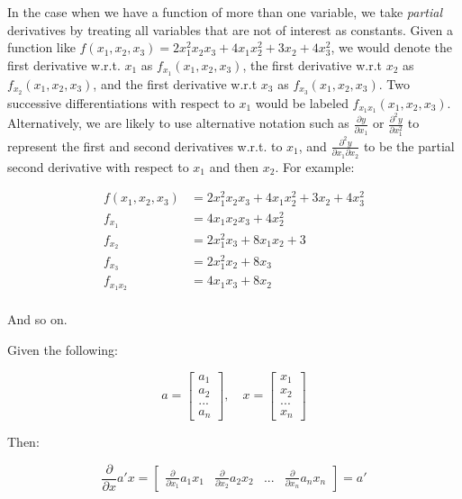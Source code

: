 \documentclass[]{book}
\theoremstyle{definition}
\theoremstyle{definition}
\theoremstyle{definition}
\theoremstyle{remark}
\begin{document}
In the case when we have a function of more than one variable, we take
\emph{partial} derivatives by treating all variables that are not of
interest as constants. Given a function like
\(f(x_1,x_2,x_3) = 2x^2_1 x_2x_3 + 4x_1 x_2^2 + 3x_2 + 4x^2_3\), we
would denote the first derivative w.r.t. \(x_1\) as
\(f_{x_1}(x_1,x_2,x_3)\), the first derivative w.r.t \(x_2\) as
\(f_{x_2}(x_1,x_2,x_3)\), and the first derivative w.r.t \(x_3\) as
\(f_{x_3}(x_1,x_2,x_3)\). Two successive differentiations with respect
to \(x_1\) would be labeled \(f_{x_1x_1}(x_1,x_2,x_3)\). Alternatively,
we are likely to use alternative notation such as
\(\frac{\partial y}{\partial x_1}\) or
\(\frac{\partial^2 y}{\partial x_1^2}\) to represent the first and
second derivatives w.r.t. to \(x_1\), and
\(\frac{\partial^2 y}{\partial x_1 \partial x_2}\) to be the partial
second derivative with respect to \(x_1\) and then \(x_2\). For example:

\begin{align*}
f(x_1,x_2,x_3) &= 2x^2_1 x_2x_3 + 4x_1 x_2^2 + 3x_2 + 4x^2_3\\
f_{x_1} &= 4x_1 x_2 x_3 + 4 x^2_2\\
f_{x_2} &= 2x^2_1x_3 + 8x_1 x_2 + 3\\
f_{x_3} &= 2x_1^2x_2 + 8x_3\\
f_{x_1 x_2} &= 4x_1 x_3 + 8x_2\\
\end{align*}

And so on.

Given the following:

\[
a = \begin{bmatrix} a_1 \\ a_2 \\ ... \\ a_n \end{bmatrix}, \quad x = \begin{bmatrix} x_1 \\ x_2 \\ ... \\ x_n \end{bmatrix}
\]

Then:

\begin{equation}
\label{vec_calc}
\frac{\partial}{\partial x}a'x = 
\begin{bmatrix} \frac{\partial}{\partial x_1} a_1x_1 & \frac{\partial}{\partial x_2} a_2x_2 & ... & \frac{\partial}{\partial x_n} a_nx_n \end{bmatrix} 
= a' 
\end{equation}
\end{document}
